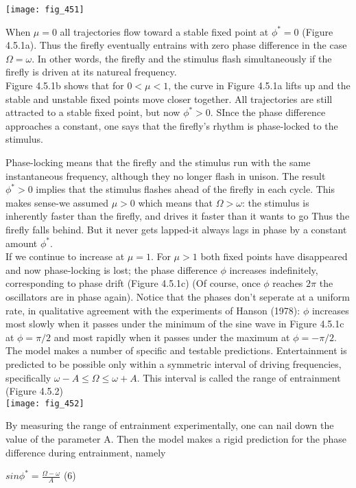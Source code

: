 \documentclass{article}
\newcommand\tab[1][1cm]{\hspace*{#1}}
\begin{document}
\texttt{[image: fig\_451]}

When $\mu=0$ all trajectories flow toward a stable fixed point at $\phi^{*}=0$ (Figure 4.5.1a). Thus the firefly eventually entrains with zero phase difference in the case $\Omega=\omega$. In other words, the firefly and the stimulus flash simultaneously if the firefly is driven at its natureal frequency. \\ \tab
Figure 4.5.1b shows that for $0< \mu<1$, the curve in Figure 4.5.1a lifts up and the stable and unstable fixed points move closer together. All trajectories are still attracted to a stable fixed point, but now $\phi^{*}>0$. SInce the phase difference approaches a constant, one says that the firefly's rhythm is phase-locked to the stimulus. \\ \tab

Phase-locking means that the firefly and the stimulus run with the same instantaneous frequency, although they no longer flash in unison. The result $\phi^{*}>0$ implies that the stimulus flashes ahead of the firefly in each cycle. This makes sense-we assumed $\mu>0$ which means that $\Omega>\omega$: the stimulus is inherently faster than the firefly, and drives it faster than it wants to go Thus the firefly falls behind. But it never gets lapped-it always lags in phase by a constant amount $\phi^{*}$. \\ \tab
If we continue to increase at $\mu=1$. For $\mu > 1$ both fixed points have disappeared and now phase-locking is lost; the phase difference $\phi$ increases indefinitely, corresponding to phase drift (Figure 4.5.1c) (Of course, once $\phi$ reaches $2\pi$ the oscillators are in phase again). Notice that the phases don't seperate at a uniform rate, in qualitative agreement with the experiments of Hanson (1978): $\phi$ increases most slowly when it passes under the minimum of the sine wave in Figure 4.5.1c at $\phi=\pi/2$ and most rapidly when it passes under the maximum at $\phi=-\pi/2$. \\ \tab
The model makes a number of specific and testable predictions. Entertainment is predicted to be possible only within a symmetric interval of driving frequencies, specifically $\omega-A \leq \Omega \leq \omega + A$. This interval is called the range of entrainment (Figure 4.5.2)
\\
\texttt{[image: fig\_452]}

By measuring the range of entrainment experimentally, one can nail down the value of the parameter A. Then the model makes a rigid prediction for the phase difference during entrainment, namely
\begin{center}
$sin\phi^{*}=\frac{\Omega-\omega}{A}$ \tab (6)
\end{center}
\end{document}
